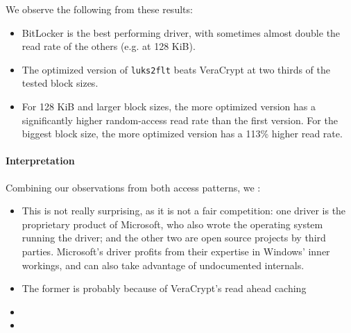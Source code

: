 We observe the following from these results:
\begin{itemize}
	\item BitLocker is the best performing driver, with sometimes almost double the read rate of the others (e.g. at 128 KiB).
	\item The optimized version of \texttt{luks2flt} beats VeraCrypt at two thirds of the tested block sizes. 
	\item For 128 KiB and larger block sizes, the more optimized version has a significantly higher random-access read rate than the first version. For the biggest block size, the more optimized version has a 113\% higher read rate.
\end{itemize}

\paragraph{Interpretation}
Combining our observations from both access patterns, we : 
\begin{itemize}
	\item {} This is not really surprising, as it is not a fair competition: one driver is the proprietary product of Microsoft, who also wrote the operating system running the driver; and the other two are open source projects by third parties. Microsoft's driver profits from their expertise in Windows' inner workings, and can also take advantage of undocumented internals.
	\item {} The former is probably because of VeraCrypt's read ahead caching 
	\item {}
	\item {}
\end{itemize}

